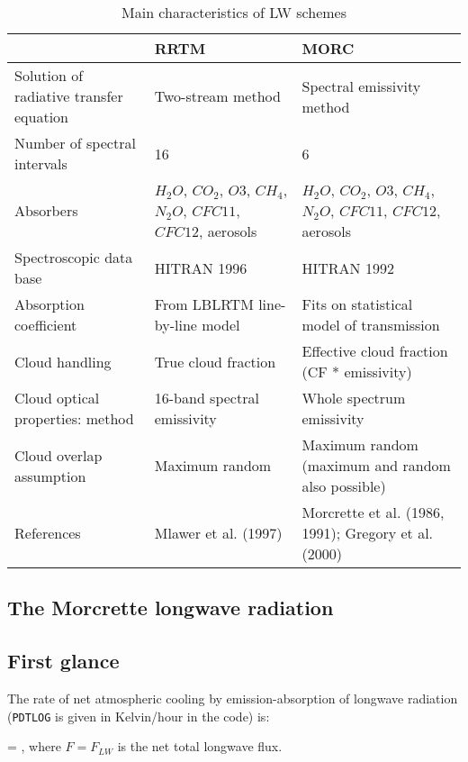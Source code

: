 \begin{table}[h]
 \caption{Main characteristics of LW schemes}
\begin{center}
   \begin{tabular}{p{5cm}|p{5cm}|p{5cm}} \label{radtable1}
          & RRTM & MORC   \\
    \hline
    \hline
    Solution of radiative transfer equation & Two-stream method & Spectral emissivity method \\
    \hline
    Number of spectral intervals & 16  & 6 \\
    \hline
    Absorbers & $H_{2}O$, $CO_{2}$, $O{3}$, $CH_{4}$, $N_{2}O$, $CFC11$, $CFC12$, aerosols & $H_{2}O$, $CO_{2}$, $O{3}$, $CH_{4}$, $N_{2}O$, $CFC11$, $CFC12$, aerosols \\            
    \hline
    Spectroscopic data base & HITRAN 1996 & HITRAN 1992 \\
    \hline
    Absorption coefficient & From LBLRTM line-by-line model & Fits on statistical model of transmission \\
    \hline
    Cloud handling & True cloud fraction & Effective cloud fraction (CF * emissivity) \\ 
    \hline
    Cloud optical properties: method & 16-band spectral emissivity & Whole spectrum emissivity \\
    \hline
    Cloud overlap assumption & Maximum random & Maximum random (maximum and random also possible) \\
    \hline
    References & Mlawer et al. (1997) & Morcrette et al. (1986, 1991); Gregory et al. (2000)    \\
   \end{tabular}
\end{center}
\end{table}

\subsection{The Morcrette longwave radiation}
%
\subsection{First glance}
%

The rate of net atmospheric cooling by emission-absorption of longwave radiation
({\tt PDTLOG} is given in Kelvin/hour in the code) is:

\medskip
\be
{} =  ,
\label{ecmwf21}
\ee
\medskip
\noindent where $F=F_{LW}$ is the net total longwave flux.

